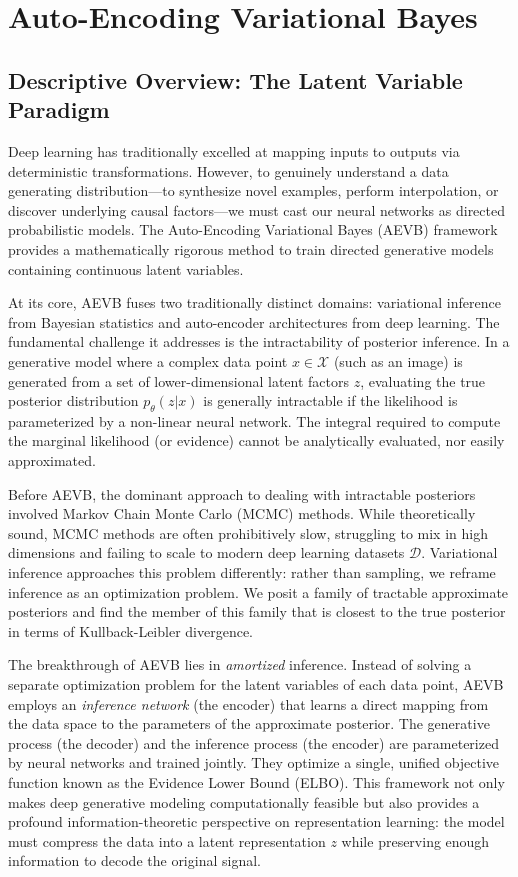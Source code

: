 \chapter{Auto-Encoding Variational Bayes}
\label{ch:vae}

\section{Descriptive Overview: The Latent Variable Paradigm}

Deep learning has traditionally excelled at mapping inputs to outputs via deterministic transformations. However, to genuinely understand a data generating distribution---to synthesize novel examples, perform interpolation, or discover underlying causal factors---we must cast our neural networks as directed probabilistic models. The Auto-Encoding Variational Bayes (AEVB) framework provides a mathematically rigorous method to train directed generative models containing continuous latent variables. 

At its core, AEVB fuses two traditionally distinct domains: variational inference from Bayesian statistics and auto-encoder architectures from deep learning. The fundamental challenge it addresses is the intractability of posterior inference. In a generative model where a complex data point $x \in \mathcal{X}$ (such as an image) is generated from a set of lower-dimensional latent factors $z$, evaluating the true posterior distribution $p_\theta(z|x)$ is generally intractable if the likelihood is parameterized by a non-linear neural network. The integral required to compute the marginal likelihood (or evidence) cannot be analytically evaluated, nor easily approximated.

Before AEVB, the dominant approach to dealing with intractable posteriors involved Markov Chain Monte Carlo (MCMC) methods. While theoretically sound, MCMC methods are often prohibitively slow, struggling to mix in high dimensions and failing to scale to modern deep learning datasets $\mathcal{D}$. Variational inference approaches this problem differently: rather than sampling, we reframe inference as an optimization problem. We posit a family of tractable approximate posteriors and find the member of this family that is closest to the true posterior in terms of Kullback-Leibler divergence. 

The breakthrough of AEVB lies in \textit{amortized} inference. Instead of solving a separate optimization problem for the latent variables of each data point, AEVB employs an \textit{inference network} (the encoder) that learns a direct mapping from the data space to the parameters of the approximate posterior. The generative process (the decoder) and the inference process (the encoder) are parameterized by neural networks and trained jointly. They optimize a single, unified objective function known as the Evidence Lower Bound (ELBO). This framework not only makes deep generative modeling computationally feasible but also provides a profound information-theoretic perspective on representation learning: the model must compress the data into a latent representation $z$ while preserving enough information to decode the original signal.

